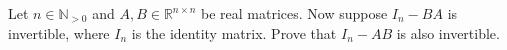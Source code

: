 \begin{problem}
    Let \( n \in \mathbb{N}_{>0} \) and \( A, B \in \mathbb{R}^{n \times n} \) be real matrices. Now suppose \( I_n - BA \) is invertible, where \( I_n \) is the identity matrix. Prove that \( I_n - AB \) is also invertible.
\end{problem}

